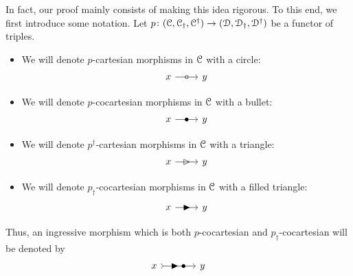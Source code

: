 \documentclass[main.tex]{subfiles}
\begin{document}
In fact, our proof mainly consists of making this idea rigorous. To this end, we first introduce some notation. Let $p\colon (\mathcal{C}, \mathcal{C}_{\dagger}, \mathcal{C}^{\dagger}) \to (\mathcal{D}, \mathcal{D}_{\dagger}, \mathcal{D}^{\dagger})$ be a functor of triples.
\begin{itemize}
  \item We will denote $p$-cartesian morphisms in $\mathcal{C}$ with a circle:
    \begin{equation*}
      \begin{tikzcd}
        x
        \arrow[r, "\circ" marking]
        & y
      \end{tikzcd}
    \end{equation*}

  \item We will denote $p$-cocartesian morphisms in $\mathcal{C}$ with a bullet:
    \begin{equation*}
      \begin{tikzcd}
        x
        \arrow[r, "\bullet" marking]
        & y
      \end{tikzcd}
    \end{equation*}

  \item We will denote $p^{\dagger}$-cartesian morphisms in $\mathcal{C}$ with a triangle:
    \begin{equation*}
      \begin{tikzcd}
        x
        \arrow[r, "\vartriangleright" marking]
        & y
      \end{tikzcd}
    \end{equation*}

  \item We will denote $p_{\dagger}$-cocartesian morphisms in $\mathcal{C}$ with a filled triangle:
    \begin{equation*}
      \begin{tikzcd}
        x
        \arrow[r, "\blacktriangleright" marking]
        & y
      \end{tikzcd}
    \end{equation*}
\end{itemize}
Thus, an ingressive morphism which is both $p$-cocartesian and $p_{\dagger}$-cocartesian will be denoted by
\begin{equation*}
  \begin{tikzcd}[column sep=large]
    x
    \arrow[r, rightarrowtail, "\blacktriangleright \bullet" marking]
    & y
  \end{tikzcd}
\end{equation*}
\end{document}
